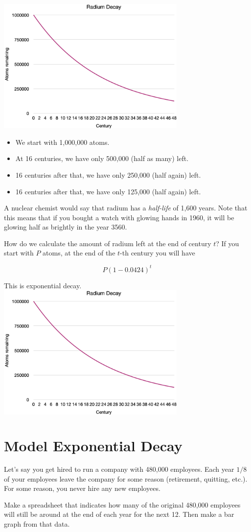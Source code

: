 \includegraphics[width=0.7\textwidth]{radium_decay.png}
 
\begin{itemize}
\item We start with 1,000,000 atoms.
\item At 16 centuries, we have only 500,000 (half as many) left.
\item 16 centuries after that, we have only 250,000 (half again) left.
\item 16 centuries after that, we have only 125,000 (half again) left.
\end{itemize}

A nuclear chemist would say that radium has a \textit{half-life} of
1,600 years. Note that this means that if you bought a watch with
glowing hands in 1960, it will be glowing half as brightly in the year
3560.

How do we calculate the amount of radium left at the end of century
$t$? If you start with $P$ atoms, at the end of the $t$-th century you
will have

$$P\left(1 - 0.0424\right)^t$$

This is exponential decay.
\includegraphics[width=0.7\textwidth]{radium_decay.png}

\section{Model Exponential Decay}

Let's say you get hired to run a company with 480,000
employees. Each year $1/8$ of your employees leave the company for
some reason (retirement, quitting, etc.). For some reason, you never
hire any new employees.

Make a spreadsheet that indicates how many of the original 480,000
employees will still be around at the end of each year for the next 12. Then make a
bar graph from that data.
